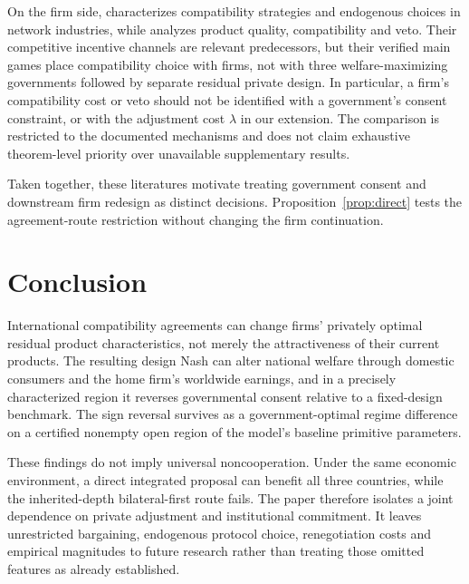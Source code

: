\documentclass[11pt,a4paper]{article}
\theoremstyle{remark}\newtheorem{remark}[theorem]{Remark}
\begin{document}
On the firm side, \citet{Buccella2023} characterizes compatibility strategies and endogenous choices in network industries, while \citet{Cheng2025} analyzes product quality, compatibility and veto. Their competitive incentive channels are relevant predecessors, but their verified main games place compatibility choice with firms, not with three welfare-maximizing governments followed by separate residual private design. In particular, a firm's compatibility cost or veto should not be identified with a government's consent constraint, or with the adjustment cost $\lambda$ in our extension. The comparison is restricted to the documented mechanisms and does not claim exhaustive theorem-level priority over unavailable supplementary results.

Taken together, these literatures motivate treating government consent and downstream firm redesign as distinct decisions. Proposition~\ref{prop:direct} tests the agreement-route restriction without changing the firm continuation.

\section{Conclusion}
International compatibility agreements can change firms' privately optimal residual product characteristics, not merely the attractiveness of their current products. The resulting design Nash can alter national welfare through domestic consumers and the home firm's worldwide earnings, and in a precisely characterized region it reverses governmental consent relative to a fixed-design benchmark. The sign reversal survives as a government-optimal regime difference on a certified nonempty open region of the model's baseline primitive parameters.

These findings do not imply universal noncooperation. Under the same economic environment, a direct integrated proposal can benefit all three countries, while the inherited-depth bilateral-first route fails. The paper therefore isolates a joint dependence on private adjustment and institutional commitment. It leaves unrestricted bargaining, endogenous protocol choice, renegotiation costs and empirical magnitudes to future research rather than treating those omitted features as already established.

\appendix
\end{document}
